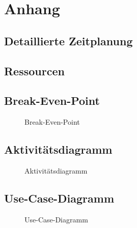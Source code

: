 \section{Anhang}
\subsection{Detaillierte Zeitplanung}
\label{app:Zeitplanung}
\clearpage

\subsection{Ressourcen}
\label{app:Ressourcen}

\clearpage

\subsection{Break-Even-Point}
\label{app:BreakEvenPoint}
\begin{figure}[!htb]
    \centering
    \caption{Break-Even-Point}
\end{figure}


\clearpage

\subsection{Aktivitätsdiagramm}
\label{app:Aktivitaet}
\begin{figure}[!htb]
    \centering
    \caption{Aktivitätsdiagramm}
\end{figure}
\clearpage

\subsection{Use-Case-Diagramm}
\label{app:UseCase}
\begin{figure}[!htb]
    \centering
    \caption{Use-Case-Diagramm}
\end{figure}
\clearpage
\thispagestyle{empty}

\clearpage

\clearpage


